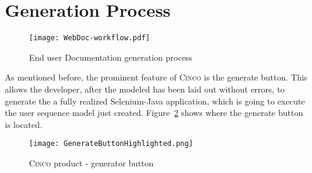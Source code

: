 \section{Generation Process}\label{sec:GenProcess}

\begin{figure}[h]
    \centering
    \texttt{[image: WebDoc-workflow.pdf]}
    \caption{End user Documentation generation process}
    \label{fig:WebDocWorkflow}
\end{figure}

As mentioned before, the prominent feature of \textsc{Cinco} is the generate button. This allows the developer, after the modeled has been laid out without errors, to generate the a fully realized Selenium-Java application, which is going to execute the user sequence model just created. Figure~\ref{fig:genButton} shows where the generate button is located.

\begin{figure}[H]
    \centering
    \texttt{[image: GenerateButtonHighlighted.png]}
    \caption{\textsc{Cinco} product - generator button}
    \label{fig:genButton}
\end{figure}

